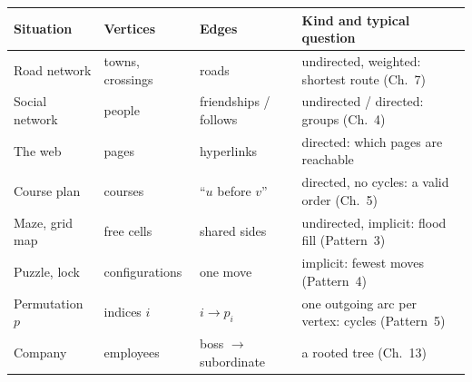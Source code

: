 \begin{table}[H]
\centering\small
\begin{tabularx}{\linewidth}{@{}l l l X@{}}
\toprule
\textbf{Situation} & \textbf{Vertices} & \textbf{Edges} & \textbf{Kind and typical question} \\
\midrule
Road network & towns, crossings & roads & undirected, weighted: shortest route (Ch.~7) \\
Social network & people & friendships / follows & undirected / directed: groups (Ch.~4) \\
The web & pages & hyperlinks & directed: which pages are reachable \\
Course plan & courses & ``$u$ before $v$'' & directed, no cycles: a valid order (Ch.~5) \\
Maze, grid map & free cells & shared sides & undirected, implicit: flood fill (Pattern~3) \\
Puzzle, lock & configurations & one move & implicit: fewest moves (Pattern~4) \\
Permutation $p$ & indices $i$ & $i\to p_i$ & one outgoing arc per vertex: cycles (Pattern~5) \\
Company & employees & boss $\to$ subordinate & a rooted tree (Ch.~13) \\
\bottomrule
\end{tabularx}
\end{table}

